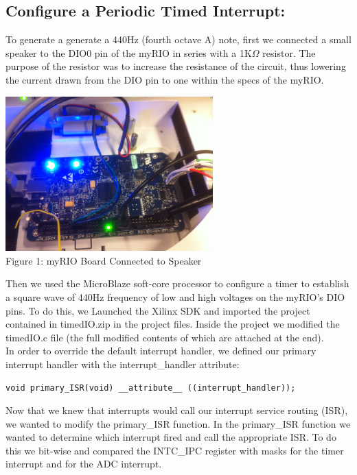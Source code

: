 \documentclass[twoside]{article}
\begin{document}
\begin{multicols}{2} %

\section{Configure a Periodic Timed Interrupt:}

\noindent To generate a generate a 440Hz (fourth octave A) note, first we connected a small speaker to the DIO0 pin of the myRIO in series with a 1K$\Omega$ resistor. The purpose of the resistor was to increase the resistance of the circuit, thus lowering the current drawn from the DIO pin to one within the specs of the myRIO.\\

\begin{center}
\includegraphics*[width = 8cm]{Fig1.jpg}\\
Figure 1: myRIO Board Connected to Speaker
\end{center}

\noindent Then we used the MicroBlaze soft-core processor to configure a timer to establish a square wave of 440Hz frequency of low and high voltages on the myRIO's DIO pins. To do this, we Launched the Xilinx SDK and imported the project contained in timedIO.zip in the project files. Inside the project we modified the timedIO.c file (the full modified contents of which are attached at the end).\\

\noindent In order to override the default interrupt handler, we defined our primary interrupt handler with the interrupt\_handler attribute:

\begin{lstlisting}[frame=single]
void primary_ISR(void) __attribute__ ((interrupt_handler));
\end{lstlisting}

\noindent Now that we knew that interrupts would call our interrupt service routing (ISR), we wanted to modify the primary\_ISR function. In the primary\_ISR function we wanted to determine which interrupt fired and call the appropriate ISR. To do this we bit-wise and compared the INTC\_IPC register with masks for the timer interrupt and for the ADC interrupt.\\


\end{multicols}
\end{document}
